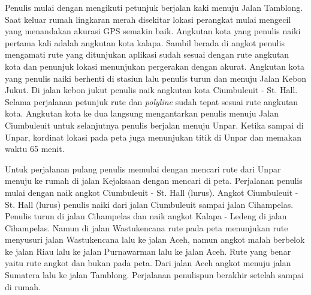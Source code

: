 			\hspace{0.5cm}Penulis mulai dengan mengikuti petunjuk berjalan kaki menuju Jalan Tamblong. Saat keluar rumah lingkaran merah disekitar lokasi perangkat mulai mengecil yang menandakan akurasi GPS semakin baik. Angkutan kota yang penulis naiki pertama kali adalah angkutan kota kalapa. Sambil berada di angkot penulis mengamati rute yang ditunjukan aplikasi sudah sesuai dengan rute angkutan kota dan penunjuk lokasi menunjukan pergerakan dengan akurat. Angkutan kota yang penulis naiki berhenti di stasiun lalu penulis turun dan menuju Jalan Kebon Jukut. Di jalan kebon jukut penulis naik angkutan kota Ciumbuleuit - St. Hall. Selama perjalanan petunjuk rute dan \textit{polyline} sudah tepat sesuai rute angkutan kota. Angkutan kota ke dua langsung mengantarkan penulis menuju Jalan Ciumbuleuit untuk selanjutnya penulis berjalan menuju Unpar. Ketika sampai di Unpar, kordinat lokasi pada peta juga menunjukan titik di Unpar dan memakan waktu 65 menit.
			
			\hspace{0.5cm}Untuk perjalanan pulang penulis memulai dengan mencari rute dari Unpar menuju ke rumah di jalan Kejaksaan dengan mencari di peta. Perjalanan penulis mulai dengan naik angkot Ciumbuleuit - St. Hall (lurus). Angkot Ciumbuleuit - St. Hall (lurus) penulis naiki dari jalan Ciumbuleuit sampai jalan Cihampelas. Penulis turun di jalan Cihampelas dan naik angkot Kalapa - Ledeng di jalan Cihampelas. Namun di jalan Wastukencana rute pada peta menunjukan rute menyusuri jalan Wastukencana lalu ke jalan Aceh, namun angkot malah berbelok ke jalan Riau lalu ke jalan Purnawarman lalu ke jalan Aceh. Rute yang benar yaitu rute angkot dan bukan pada peta. Dari jalan Aceh angkot menuju jalan Sumatera lalu ke jalan Tamblong. Perjalanan penulispun berakhir setelah sampai di rumah.\\
		


	
